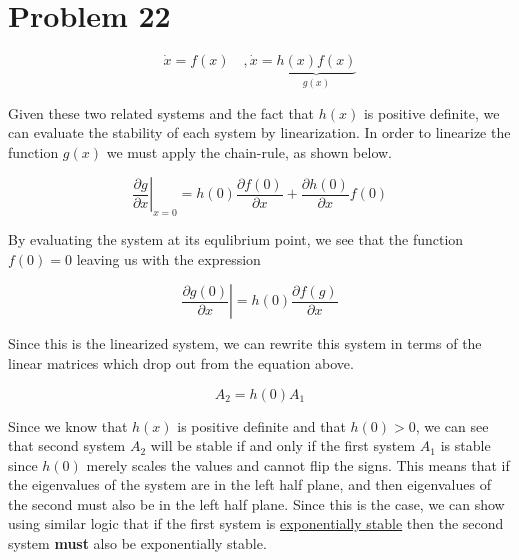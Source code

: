 \section*{Problem 22}




$$
\dot{x}=f(x) \quad, \dot{x}=\underbrace{h(x) f(x)}_{g(x)}
$$

\noindent Given these two related systems and the fact that $h(x)$ is positive definite, we can evaluate the stability of each system by linearization. In order to linearize the function $g(x)$ we must apply the chain-rule, as shown below.

$$
\left.\frac{\partial g}{\partial x}\right|_{x=0}=h(0) \frac{\partial f(0)}{\partial x}+\frac{\partial h(0)}{\partial x} f(0)
$$

\noindent By evaluating the system at its equlibrium point, we see that the function $f(0)=0$ leaving us with the expression


$$
\left.\frac{\partial g(0)}{\partial x}\right|=h(0) \frac{\partial f(g)}{\partial x}
$$

\noindent Since this is the linearized system, we can rewrite this system in terms of the linear matrices which drop out from the equation above.


$$
A_2 = h(0)A_1
$$

\noindent Since we know that $h(x)$ is positive definite and that $h(0)>0$, we can see that second system $A_2$ will be stable if and only if the first system $A_1$ is stable since $h(0)$ merely scales the values and cannot flip the signs. This means that if the eigenvalues of the system are in the left half plane, and then eigenvalues of the second must also be in the left half plane. Since this is the case, we can show using similar logic that if the first system is \underline{exponentially stable} then the second system \textbf{must} also be exponentially stable. 
